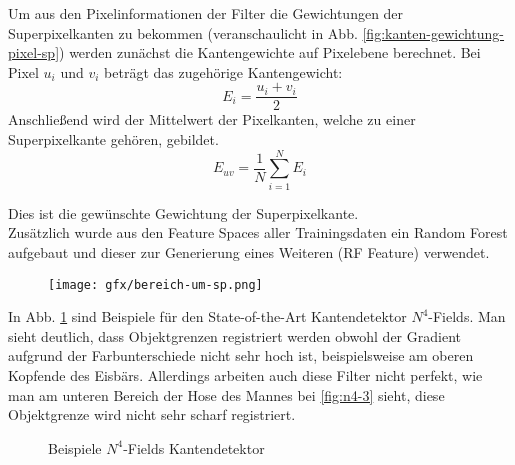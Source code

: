 Um aus den Pixelinformationen der Filter die Gewichtungen der Superpixelkanten zu bekommen (veranschaulicht in Abb. \ref{fig:kanten-gewichtung-pixel-sp}) werden zunächst die Kantengewichte auf Pixelebene berechnet. Bei Pixel $u_i$ und $v_i$ beträgt das zugehörige Kantengewicht:
\begin{equation}
	E_{i}=\frac{u_i+v_i}{2}
\end{equation} 
Anschließend wird der Mittelwert der Pixelkanten, welche zu einer Superpixelkante gehören, gebildet. 
\begin{equation}
E_{uv} = \frac{1}{N} \sum\limits_{i=1}^{N} E_i
\end{equation}

Dies ist die gewünschte Gewichtung der Superpixelkante. \\


Zusätzlich wurde aus den Feature Spaces aller Trainingsdaten ein Random Forest aufgebaut und dieser zur Generierung eines Weiteren (RF Feature) verwendet.

\vspace{1cm}

\begin{figure}[H]
	\centering
	\texttt{[image: gfx/bereich-um-sp.png]}
\end{figure}
\label{fig:var-bereich-sp}
\vspace{0.5cm}

\newpage

In Abb. \ref{fig:n4} sind Beispiele für den State-of-the-Art Kantendetektor $N^4$-Fields. Man sieht deutlich, dass Objektgrenzen registriert werden obwohl der Gradient aufgrund der Farbunterschiede nicht sehr hoch ist, beispielsweise am oberen Kopfende des Eisbärs. Allerdings arbeiten auch diese Filter nicht perfekt, wie man am unteren Bereich der Hose des Mannes bei \ref{fig:n4-3} sieht, diese Objektgrenze wird nicht sehr scharf registriert. 


\begin{figure}[H]
	\centering
	\hfill
	
	\hfill
	
	\caption{Beispiele $N^4$-Fields Kantendetektor}
	\label{fig:n4}
\end{figure}

